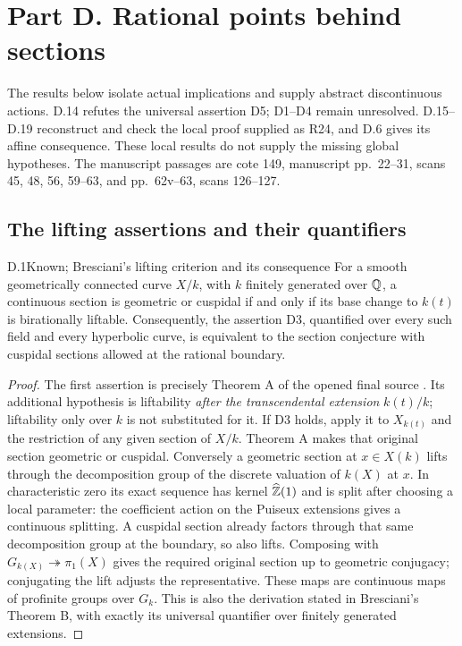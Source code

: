 \section{Part D. Rational points behind sections}
\label{sec:partD}

The results below isolate actual implications and supply abstract
discontinuous actions. D.14 refutes the universal assertion D5;
D1--D4 remain unresolved. D.15--D.19 reconstruct and check the
local proof supplied as R24, and D.6 gives its affine consequence.
These local results do not supply the missing global hypotheses.
The manuscript passages are cote 149, manuscript pp.~22--31,
scans 45, 48, 56, 59--63, and pp.~62v--63, scans 126--127.

\subsection{The lifting assertions and their quantifiers}

\begin{claim}{D.1}{Known; Bresciani's lifting criterion and its consequence}
For a smooth geometrically connected curve $X/k$, with $k$ finitely
generated over $\mathbb Q$, a continuous section is geometric or cuspidal
if and only if its base change to $k(t)$ is birationally liftable.
Consequently, the assertion D3, quantified over every such field and
every hyperbolic curve, is equivalent to the section conjecture with
cuspidal sections allowed at the rational boundary.
\end{claim}
\begin{proof}
The first assertion is precisely Theorem A of the opened final source
\citet{D_Bresciani2023}. Its additional hypothesis is liftability
\emph{after the transcendental extension} $k(t)/k$; liftability only
over $k$ is not substituted for it.
If D3 holds, apply it to $X_{k(t)}$ and the restriction of any given
section of $X/k$. Theorem A makes that original section geometric or
cuspidal. Conversely a geometric section at $x\in X(k)$ lifts through
the decomposition group of the discrete valuation of $k(X)$ at $x$.
In characteristic zero its exact sequence has kernel
$\widehat{\mathbb Z}(1)$ and is split after choosing a local parameter:
the coefficient action on the Puiseux extensions gives a continuous
splitting. A cuspidal section already factors through that same
decomposition group at the boundary, so also lifts. Composing with
$G_{k(X)}\twoheadrightarrow\pi_1(X)$ gives the required original
section up to geometric conjugacy; conjugating the lift adjusts the
representative. These maps are continuous maps of profinite groups
over $G_k$. This is also the derivation stated in Bresciani's
Theorem B, with exactly its universal quantifier over finitely
generated extensions.
\end{proof}

